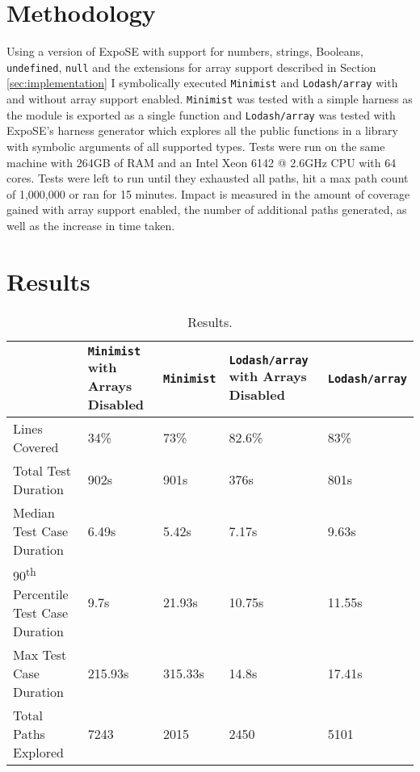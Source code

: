 \documentclass[]{final_report}
\begin{document}
\section{Methodology}
Using a version of ExpoSE with support for numbers, strings, Booleans, \lstinline|undefined|, \lstinline|null| and the extensions for array support described in Section \ref{sec:implementation} I symbolically executed \lstinline|Minimist| and \lstinline|Lodash/array| with and without array support enabled. \lstinline|Minimist| was tested with a simple harness as the module is exported as a single function and \lstinline|Lodash/array| was tested with ExpoSE's harness generator which explores all the public functions in a library with symbolic arguments of all supported types. Tests were run on the same machine with 264GB of RAM and an Intel Xeon 6142 @ 2.6GHz CPU with 64 cores. Tests were left to run until they exhausted all paths, hit a max path count of 1,000,000 or ran for 15 minutes. Impact is measured in the amount of coverage gained with array support enabled, the number of additional paths generated, as well as the increase in time taken.

\section{Results}
\begin{table}[t]
\centering
\begin{tabular}{|p{4cm}|p{2cm}|p{2cm}|p{2cm}|p{2cm}|}
\hline
& \lstinline|Minimist| with Arrays Disabled & \lstinline|Minimist| & \lstinline|Lodash/array| with Arrays Disabled & \lstinline|Lodash/array| \\ \hline
Lines Covered & 34\% & 73\% & 82.6\% & 83\% \\ \hline
Total Test Duration & 902s & 901s & 376s & 801s \\ \hline
Median Test Case Duration & 6.49s & 5.42s & 7.17s & 9.63s \\ \hline
90\textsuperscript{th} Percentile Test Case Duration & 9.7s & 21.93s & 10.75s & 11.55s \\ \hline
Max Test Case Duration & 215.93s & 315.33s & 14.8s & 17.41s \\ \hline
Total Paths Explored & 7243 & 2015 & 2450 & 5101 \\ \hline
\end{tabular}
\caption{Results.}
\label{table:results}
\end{table}
\end{document}
